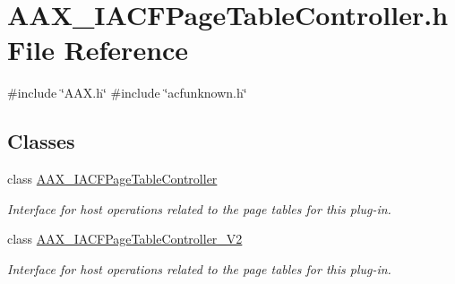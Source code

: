 \hypertarget{a00548}{}\section{A\+A\+X\+\_\+\+I\+A\+C\+F\+Page\+Table\+Controller.\+h File Reference}
\label{a00548}
{\ttfamily \#include \char`\"{}A\+A\+X.\+h\char`\"{}}\newline
{\ttfamily \#include \char`\"{}acfunknown.\+h\char`\"{}}\newline
\subsection*{Classes}
\begin{DoxyCompactItemize}
\item 
class \mbox{\hyperlink{a01733}{A\+A\+X\+\_\+\+I\+A\+C\+F\+Page\+Table\+Controller}}
\begin{DoxyCompactList}\small\item\em Interface for host operations related to the page tables for this plug-\/in. \end{DoxyCompactList}\item 
class \mbox{\hyperlink{a01737}{A\+A\+X\+\_\+\+I\+A\+C\+F\+Page\+Table\+Controller\+\_\+\+V2}}
\begin{DoxyCompactList}\small\item\em Interface for host operations related to the page tables for this plug-\/in. \end{DoxyCompactList}\end{DoxyCompactItemize}

